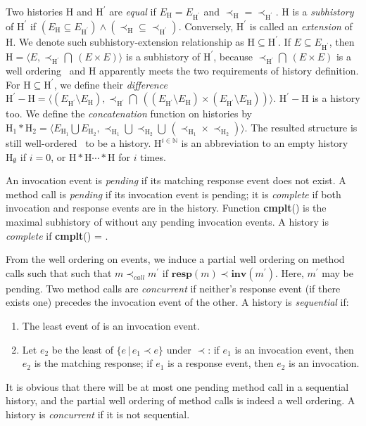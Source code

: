 \documentclass[a4paper,USenglish]{lipics-v2016}
\newcommand{\cmplt}{\textbf{cmplt}}
\newcommand{\myinv}{\textbf{inv}}
\newcommand{\myresp}{\textbf{resp}}
\newcommand{\his}{\text{H}}
\newcommand{\evts}{\textit{E}}
\newcommand{\myvert}{\vert}
\begin{document}
Two histories $\his$ and $\his^\prime$ are \textit{equal}
if $\evts_{\his} = \evts_{\his^\prime}$ and $\prec_{\his} = \prec_{\his^\prime}$.
$\his$ is a \textit{subhistory} of $\his^\prime$
if $(\evts_{\his} \subseteq \evts_{\his^\prime}) \land (\prec_{\his} \subseteq \prec_{\his^\prime})$.
Conversely, $\his^\prime$ is called an \textit{extension} of $\his$.
We denote such subhistory-extension relationship as $\his \subseteq \his^\prime$.
If $\evts \subseteq \evts_{\his^\prime}$,
then $\his = \langle \evts, \prec_{\his^\prime} \bigcap \ (\evts \times \evts) \rangle$ is a subhistory of $\his^\prime$,
because $\prec_{\his^\prime} \bigcap \ (\evts \times \evts)$ is a well ordering~\cite{Enderton77}
and $\his$ apparently meets the two requirements of history definition.
For $\his \subseteq \his^\prime$, we define their \textit{difference}
$\his^\prime - \his = \langle (\evts_{\his^\prime} \setminus \evts_{\his}), \prec_{\his^\prime} \bigcap \ ((\evts_{\his^\prime} \setminus \evts_{\his}) \times (\evts_{\his^\prime} \setminus \evts_{\his})) \rangle$.
$\his^\prime - \his$ is a history too.
We define the \textit{concatenation} function on histories by
$\his_1 \ast \his_2 = \langle \evts_{\his_1} \bigcup \evts_{\his_2}, \prec_{\his_1} \bigcup \prec_{\his_2} \bigcup \, (\prec_{\his_1} \times \prec_{\his_2})\rangle$.
The resulted structure is still well-ordered~\cite{Enderton77} to be a history.
$\his^{i \in \mathbb{N}}$ is an abbreviation to an empty history $\his_{\emptyset}$ if $i = 0$,
or $\his \ast \his \cdots \ast \his$ for $i$ times.

An invocation event is \textit{pending} if its matching response event does not exist.
A method call is \textit{pending} if its invocation event is pending;
it is \textit{complete} if both invocation and response events are in the history.
Function \cmplt(\his) is the maximal subhistory of {\his} without any pending invocation events.
A history {\his} is \textit{complete} if \cmplt({\his}) = {\his}.


From the well ordering on events, we induce a partial well ordering on method calls such that such that $m \prec_{call} m^\prime$ if $\myresp(m) \prec \myinv(m^\prime)$.
Here, $m^\prime$ may be pending.
Two method calls are \textit{concurrent} if neither's response event (if there exists one) precedes the invocation event of the other.
A history {\his} is \textit{sequential} if:
\begin{enumerate}[(1)]
	\item
	The least event of {\his} is an invocation event.
	\item
	Let $e_2$ be the least of $\{e \, \myvert \, e_1 \prec e\}$ under $\prec$:
	if $e_1$ is an invocation event, then $e_2$ is the matching response;
	if $e_1$ is a response event, then $e_2$ is an invocation.
\end{enumerate}
It is obvious that there will be at most one pending method call in a sequential history, and the partial well ordering of method calls is indeed a well ordering.
A history is \textit{concurrent} if it is not sequential.
\end{document}
